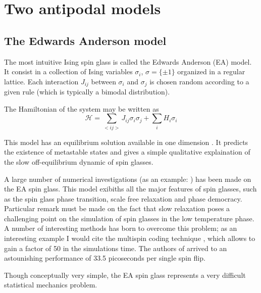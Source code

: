\section{Two antipodal models}

\subsection{The Edwards Anderson model}

The most intuitive Ising spin glass is called the Edwards Anderson (EA) model. It consist in a collection of Ising variables $\sigma_i$, $\sigma = \{\pm 1\}$ organized in a regular lattice. Each interaction $J_{ij}$ between $\sigma_i$ and $\sigma_j$ is chosen random according to a given rule (which is typically a bimodal distribution).

The Hamiltonian of the system may be written as
\begin{equation}
\mathcal{H} = \sum_{<ij>} J_{ij}\sigma_i\sigma_j + \sum_i H_i \sigma_i
\end{equation}

This model has an equilibrium solution available in one dimension \cite{medina}. It predicts the existence of metastable states and gives a simple qualitative explaination of the slow off-equilibrium dynamic of spin glasses.

A large number of numerical investigations (as an example: \cite{EA}) has been made on the EA spin glass. This model exibiths all the major features of spin glasses, such as the spin glass phase transition, scale free relaxation and phase democracy. Particular remark must be made on the fact that slow relaxation poses a challenging point on the simulation of spin glasses in the low temperature phase. A number of
interesting methods has born to overcome this problem; as an interesting example I would cite the multispin coding technique \cite{multispin}, which allows to gain a factor of 50 in the simulations time. The authors of \cite{multispin} arrived to an astounishing performance of 33.5 picoseconds per single spin flip.

Though conceptually very simple, the EA spin glass represents a very difficult statistical mechanics problem.

